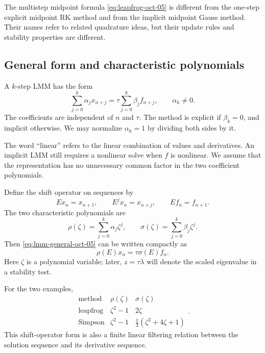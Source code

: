 The multistep midpoint formula \eqref{eq:leapfrog-oct-05} is
different from the one-step explicit midpoint RK method and from
the implicit midpoint Gauss method. Their names refer to related
quadrature ideas, but their update rules and stability properties
are different.

\subsection{General form and characteristic polynomials}

\begin{definition}
 A \(k\)-step LMM has the form
 \begin{equation}\label{eq:lmm-general-oct-05}
  \sum_{j=0}^k\alpha_jx_{n+j}
    =\tau\sum_{j=0}^k\beta_j f_{n+j},
  \qquad \alpha_k\neq0.
 \end{equation}
 The coefficients are independent of \(n\) and \(\tau\).
 The method is explicit if \(\beta_k=0\), and implicit otherwise.
 We may normalize \(\alpha_k=1\) by dividing both sides by it.
\end{definition}

The word ``linear'' refers to the linear combination of values and
derivatives. An implicit LMM still requires a nonlinear solve when
\(f\) is nonlinear. We assume that the representation has no
unnecessary common factor in the two coefficient polynomials.

Define the shift operator on sequences by
\[
 Ex_n=x_{n+1},\qquad E^jx_n=x_{n+j},\qquad Ef_n=f_{n+1}.
\]
The two characteristic polynomials are
\begin{equation}\label{eq:lmm-polynomials-oct-05}
 \rho(\zeta)=\sum_{j=0}^k\alpha_j\zeta^j,
 \qquad
 \sigma(\zeta)=\sum_{j=0}^k\beta_j\zeta^j.
\end{equation}
Then \eqref{eq:lmm-general-oct-05} can be written compactly as
\begin{equation}\label{eq:lmm-shift-oct-05}
 \rho(E)x_n=\tau\sigma(E)f_n.
\end{equation}
Here \(\zeta\) is a polynomial variable; later, \(z=\tau\lambda\)
will denote the scaled eigenvalue in a stability test.

For the two examples,
\[
 \begin{array}{c|c|c}
  \text{method}&\rho(\zeta)&\sigma(\zeta)\\ \hline
  \text{leapfrog}&\zeta^2-1&2\zeta\\[2pt]
  \text{Simpson}&\zeta^2-1&\tfrac13(\zeta^2+4\zeta+1)
 \end{array}.
\]
This shift-operator form is also a finite linear filtering relation
between the solution sequence and its derivative sequence.

